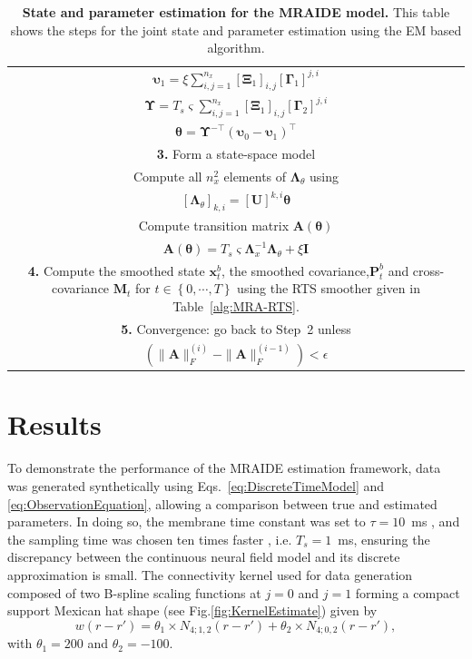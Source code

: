 \documentclass[review,authoryear,3p]{elsarticle}
\begin{document}
\begin{table}[!ht]
\begin{tabular}{|c|}
$\boldsymbol\upsilon_1=\xi\sum_{i,j=1}^{n_x}[\boldsymbol\Xi_1]_{i,j}[\boldsymbol\Gamma_1]^{j,i}$\\
$\boldsymbol\Upsilon=T_s\varsigma\sum_{i,j=1}^{n_x}[\boldsymbol\Xi_1]_{i,j}[\boldsymbol\Gamma_2]^{j,i}$\\
$\boldsymbol \theta= \boldsymbol\Upsilon^{-\top}(\boldsymbol\upsilon_0-\boldsymbol\upsilon_1)^\top$\\
\hline
\multicolumn{1}{|p{16cm}|}{\textbf{3.} Form a state-space model}\\
\multicolumn{1}{|p{16cm}|}{Compute all $n_x^2$ elements of $\boldsymbol\Lambda_{\theta}$ using} \\
$\left[ \boldsymbol\Lambda_{\theta}\right] _{k,i}=\left[ \mathbf U\right]^{k,i}\boldsymbol\theta$\\
\multicolumn{1}{|p{16cm}|}{Compute transition matrix $\mathbf A(\boldsymbol\theta)$ } \\
$\mathbf A(\boldsymbol \theta) = T_s\varsigma\mathbf{\Lambda}_{x}^{-1}\mathbf{\Lambda}_{\theta}+\xi\mathbf I$\\
\hline
\multicolumn{1}{|p{16cm}|}{\textbf{4.} Compute the smoothed state $\mathbf x_t^b$, the smoothed covariance,$\mathbf P^b_t$ and cross-covariance $\mathbf M_t$ for $t\in\left\lbrace 0,\cdots,T\right\rbrace $ using the RTS smoother given in Table~\ref{alg:MRA-RTS}.}\\  
\hline
\multicolumn{1}{|p{16cm}|}{\textbf{5.} Convergence: go back to Step~2 unless }\\
$ \left(\parallel \mathbf{A} \parallel_{F}^{(i)}-\parallel \mathbf{A} \parallel_{F}^{(i-1)}\right)<\epsilon$\\
\hline
\end{tabular}
\caption{\textbf{State and parameter estimation for the MRAIDE model.} This table shows the steps for the joint state and parameter estimation using the EM based algorithm.}
\label{alg:EMsteps}
\end{table}
\renewcommand{\arraystretch}{1}
\section{Results}\label{sec:MRA-results}
To demonstrate the performance of the MRAIDE estimation framework, data was generated synthetically  using Eqs.~\eqref{eq:DiscreteTimeModel} and \eqref{eq:ObservationEquation}, allowing a comparison between true and estimated parameters. In doing so, the membrane time constant was set to $\tau = 10$~ms \citep{David2003}, and the sampling time was chosen ten times faster \citep{Stephan2008}, i.e. $T_s = 1$~ms, ensuring the discrepancy between the continuous neural field model and its discrete approximation is small. The connectivity kernel used for data generation composed of two B-spline scaling functions at $j=0$ and $j=1$ forming a compact support Mexican hat shape (see Fig.\ref{fig:KernelEstimate}) given by
\begin{equation}\label{eq:ConnectivityKernelForData}
	w(r-r')=\theta_1\times N_{4;1,2}(r-r')+\theta_2\times N_{4;0,2}(r-r'),
\end{equation}
with $\theta_1=200$ and $\theta_2=-100$.
\end{document}
